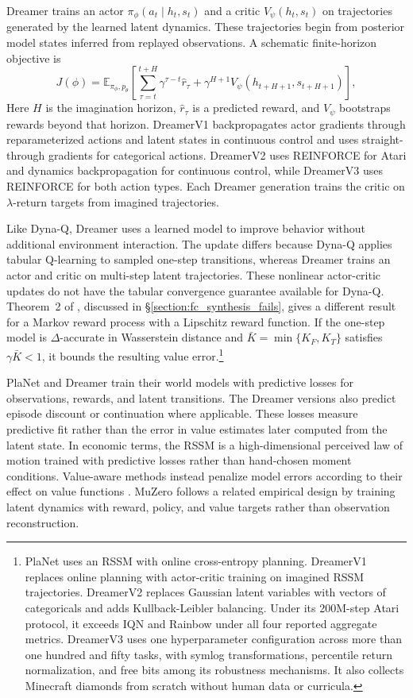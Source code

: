 Dreamer trains an actor $\pi_\phi(a_t \mid h_t, s_t)$ and a critic $V_\psi(h_t, s_t)$ on trajectories generated by the learned latent dynamics. These trajectories begin from posterior model states inferred from replayed observations. A schematic finite-horizon objective is
\[ J(\phi) = \mathbb{E}_{\pi_\phi, p_\theta}\!\left[ \sum_{\tau = t}^{t+H} \gamma^{\tau - t} \hat r_\tau + \gamma^{H+1} V_\psi(h_{t+H+1}, s_{t+H+1}) \right], \]
Here $H$ is the imagination horizon, $\hat r_\tau$ is a predicted reward, and $V_\psi$ bootstraps rewards beyond that horizon. DreamerV1 backpropagates actor gradients through reparameterized actions and latent states in continuous control and uses straight-through gradients for categorical actions. DreamerV2 uses REINFORCE for Atari and dynamics backpropagation for continuous control, while DreamerV3 uses REINFORCE for both action types. Each Dreamer generation trains the critic on $\lambda$-return targets from imagined trajectories.

Like Dyna-Q, Dreamer uses a learned model to improve behavior without additional environment interaction. The update differs because Dyna-Q applies tabular Q-learning to sampled one-step transitions, whereas Dreamer trains an actor and critic on multi-step latent trajectories. These nonlinear actor-critic updates do not have the tabular convergence guarantee available for Dyna-Q. Theorem~2 of \citet{Asadi2018Lipschitz}, discussed in \S\ref{section:fc_synthesis_fails}, gives a different result for a Markov reward process with a Lipschitz reward function. If the one-step model is $\Delta$-accurate in Wasserstein distance and $\bar K = \min\{K_F,K_T\}$ satisfies $\gamma \bar K < 1$, it bounds the resulting value error.\footnote{PlaNet \citep{HafnerPlaNet2019} uses an RSSM with online cross-entropy planning. DreamerV1 \citep{HafnerDreamer2020} replaces online planning with actor-critic training on imagined RSSM trajectories. DreamerV2 \citep{HafnerDreamerV2_2021} replaces Gaussian latent variables with vectors of categoricals and adds Kullback-Leibler balancing. Under its 200M-step Atari protocol, it exceeds IQN and Rainbow under all four reported aggregate metrics. DreamerV3 \citep{HafnerDreamerV3_2025} uses one hyperparameter configuration across more than one hundred and fifty tasks, with symlog transformations, percentile return normalization, and free bits among its robustness mechanisms. It also collects Minecraft diamonds from scratch without human data or curricula.}

PlaNet and Dreamer train their world models with predictive losses for observations, rewards, and latent transitions. The Dreamer versions also predict episode discount or continuation where applicable. These losses measure predictive fit rather than the error in value estimates later computed from the latent state. In economic terms, the RSSM is a high-dimensional perceived law of motion trained with predictive losses rather than hand-chosen moment conditions. Value-aware methods instead penalize model errors according to their effect on value functions \citep{FarahmandVAML2017,GrimmVALEQ2020}. MuZero follows a related empirical design by training latent dynamics with reward, policy, and value targets rather than observation reconstruction.

